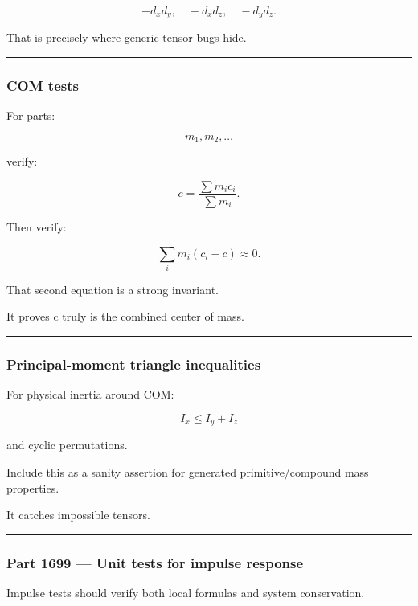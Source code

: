 \[
-d_xd_y,
\quad
-d_xd_z,
\quad
-d_yd_z.
\]

That is precisely where generic tensor bugs hide.

\begin{center}\rule{0.5\linewidth}{0.5pt}\end{center}

\subsubsection{COM tests}\label{com-tests}

For parts:

\[
m_1,m_2,\ldots
\]

verify:

\[
c
=
\frac{\sum m_ic_i}{\sum m_i}.
\]

Then verify:

\[
\sum_i
m_i(c_i-c)
\approx0.
\]

That second equation is a strong invariant.

It proves c truly is the combined center of mass.

\begin{center}\rule{0.5\linewidth}{0.5pt}\end{center}

\subsubsection{Principal-moment triangle inequalities}\label{principal-moment-triangle-inequalities}

For physical inertia around COM:

\[
I_x\le I_y+I_z
\]

and cyclic permutations.

Include this as a sanity assertion for generated primitive/compound mass properties.

It catches impossible tensors.

\begin{center}\rule{0.5\linewidth}{0.5pt}\end{center}

\subsubsection{Part 1699 --- Unit tests for impulse response}\label{part-1699-unit-tests-for-impulse-response}

Impulse tests should verify both local formulas and system conservation.

